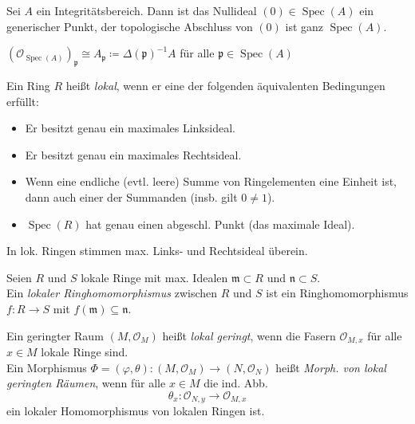\documentclass{cheat-sheet}
\renewcommand{\O}{\mathcal{O}} %
\DeclareMathOperator{\Spec}{Spec} %
\begin{document}
\begin{bem}
  Sei $A$ ein Integritätsbereich. Dann ist das Nullideal $(0) \in \Spec(A)$ ein generischer Punkt, \dh{} der topologische Abschluss von $(0)$ ist ganz $\Spec(A)$.
\end{bem}

\begin{lem}
  $(\O_{\Spec(A)})_{\mathfrak{p}} \cong A_{\mathfrak{p}} \coloneqq \Delta(\mathfrak{p})^{-1} A$ für alle $\mathfrak{p} \in \Spec(A)$
\end{lem}


\begin{defn}
  Ein Ring $R$ heißt \emph{lokal}, wenn er eine der folgenden äquivalenten Bedingungen erfüllt:
  \begin{itemize}
    \item Er besitzt genau ein maximales Linksideal.
    \item Er besitzt genau ein maximales Rechtsideal.
    \item Wenn eine endliche (evtl. leere) Summe von Ringelementen eine Einheit ist, dann auch einer der Summanden (insb. gilt $0 \not= 1$).
    \item $\Spec(R)$ hat genau einen abgeschl. Punkt (das maximale Ideal).
  \end{itemize}
\end{defn}

\begin{bem}
  In lok. Ringen stimmen max. Links- und Rechtsideal überein.
\end{bem}

\begin{defn}
  Seien $R$ und $S$ lokale Ringe mit max. Idealen $\mathfrak{m} \!\subset\! R$ und $\mathfrak{n} \!\subset\! S$. \\
  Ein \emph{lokaler Ringhomomorphismus} zwischen $R$ und $S$ ist ein Ringhomomorphismus $f : R \to S$ mit $f(\mathfrak{m}) \subseteq \mathfrak{n}$.
\end{defn}

\begin{defn}
  Ein geringter Raum $(M, \O_M)$ heißt \emph{lokal geringt}, wenn die Fasern $\O_{M,x}$ für alle $x \in M$ lokale Ringe sind. \\
  Ein Morphismus $\Phi = (\varphi, \theta) \!:\! (M, \O_M) \to (N, \O_N)$ heißt \emph{Morph. von lokal geringten Räumen}, wenn für alle $x \in M$ die ind. Abb.
  \[ \theta_x : \O_{N,y} \to \O_{M,x} \]
  ein lokaler Homomorphismus von lokalen Ringen ist.
\end{defn}
\end{document}
